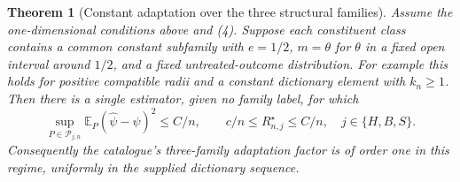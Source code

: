 \documentclass[11pt]{article}
\newtheorem{theorem}{Theorem}
\theoremstyle{definition}
\begin{document}
\begin{theorem}[Constant adaptation over the three structural families]
Assume the one-dimensional conditions above and (4). Suppose each
constituent class contains a common constant subfamily with $e=1/2$,
$m=\theta$ for $\theta$ in a fixed open interval around $1/2$, and a
fixed untreated-outcome distribution. For example this holds for positive
compatible radii and a constant dictionary element with $k_n\ge1$.
Then there is a single estimator, given no family label, for which
\[
 \sup_{P\in\mathcal P_{j,n}}\mathbb E_P(\widehat\psi-\psi)^2
 \le C/n,\qquad c/n\le R_{n,j}^\star\le C/n,
 \quad j\in\{H,B,S\}.                               \tag{8}
\]
Consequently the catalogue's three-family adaptation factor is of order
one in this regime, uniformly in the supplied dictionary sequence.
\end{theorem}
\end{document}
